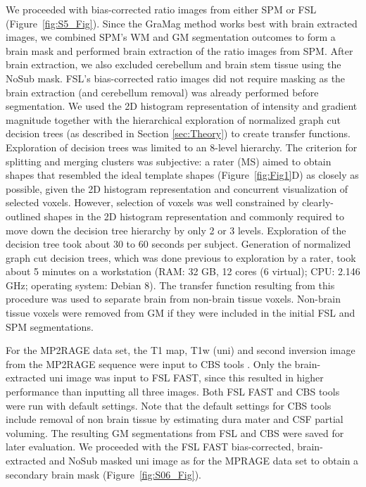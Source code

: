 We proceeded with bias-corrected ratio images from either SPM or FSL (Figure~\ref{fig:S5_Fig}). Since the GraMag method works best with brain extracted images, we combined SPM's WM and GM segmentation outcomes to form a brain mask and performed brain extraction of the ratio images from SPM. After brain extraction, we also excluded cerebellum and brain stem tissue using the NoSub mask. FSL's bias-corrected ratio images did not require masking as the brain extraction (and cerebellum removal) was already performed before segmentation. We used the 2D histogram representation of intensity and gradient magnitude together with the hierarchical exploration of normalized graph cut decision trees (as described in Section \ref{sec:Theory}) to create transfer functions. Exploration of decision trees was limited to an 8-level hierarchy. The criterion for splitting and merging clusters was subjective: a rater (MS) aimed to obtain shapes that resembled the ideal template shapes (Figure~\ref{fig:Fig1}D) as closely as possible, given the 2D histogram representation and concurrent visualization of selected voxels. However, selection of voxels was well constrained by clearly-outlined shapes in the 2D histogram representation and commonly required to move down the decision tree hierarchy by only 2 or 3 levels. Exploration of the decision tree took about 30 to 60 seconds per subject. Generation of normalized graph cut decision trees, which was done previous to exploration by a rater, took about 5 minutes on a workstation  (RAM: 32 GB, 12 cores (6 virtual); CPU: 2.146 GHz; operating system: Debian 8). The transfer function resulting from this procedure was used to separate brain from non-brain tissue voxels. Non-brain tissue voxels were removed from GM if they were included in the initial FSL and SPM segmentations.

For the MP2RAGE data set, the T1 map, T1w (uni) and second inversion image from the MP2RAGE sequence were input to CBS tools \parencite{Bazin2014}. Only the brain-extracted \parencite{Smith2002} uni image was input to FSL FAST, since this resulted in higher performance than inputting all three images. Both FSL FAST and CBS tools were run with default settings. Note that the default settings for CBS tools include removal of non brain tissue by estimating dura mater and CSF partial voluming. The resulting GM segmentations from FSL and CBS were saved for later evaluation. We proceeded with the FSL FAST bias-corrected, brain-extracted and NoSub masked uni image as for the MPRAGE data set to obtain a secondary brain mask (Figure~\ref{fig:S06_Fig}).

